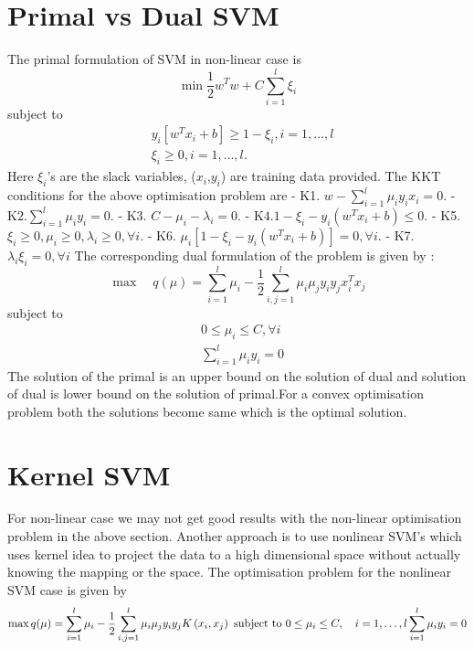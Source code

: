 \documentclass[../main.tex]{subfiles}
\begin{document}
\section{Primal vs Dual SVM}
The primal formulation of SVM in non-linear case is 
$$
\min \frac{1}{2} w^{T} w+C \sum_{i=1}^{l} \xi_{i}
$$
subject to
$$
\begin{aligned}
&y_{i}\left[w^{T} x_{i}+b\right] \geq 1-\xi_{i}, i=1, \ldots, l \\
&\xi_{i} \geq 0, i=1, \ldots, l .
\end{aligned}
$$
Here $\xi_{i}$'s are the slack variables, ($x_{i}$,$y_{i}$) are training data provided.
The KKT conditions for the above optimisation problem are 
\newline
- K1. $w-\sum_{i=1}^{l} \mu_{i} y_{i} x_{i}=0$.
\newline
- $\mathrm{K} 2 . \sum_{i=1}^{l} \mu_{i} y_{i}=0$.
\newline
- K3. $C-\mu_{i}-\lambda_{i}=0$.
\newline
- $\mathrm{K} 4.1-\xi_{i}-y_{i}\left(w^{T} x_{i}+b\right) \leq 0$.
\newline
- K5. $\xi_{i} \geq 0, \mu_{i} \geq 0, \lambda_{i} \geq 0, \forall i$.
\newline
- K6. $\mu_{i}\left[1-\xi_{i}-y_{i}\left(w^{T} x_{i}+b\right)\right]=0, \forall i$.
\newline
- K7. $\lambda_{i} \xi_{i}=0, \forall i$
\newline
The corresponding dual formulation of the problem is given by :
$$
\max \quad q(\mu)=\sum_{i=1}^{l} \mu_{i}-\frac{1}{2} \sum_{i, j=1}^{l} \mu_{i} \mu_{j} y_{i} y_{j} x_{i}^{T} x_{j}
$$
subject to
$$
\begin{aligned}
&0 \leq \mu_{i} \leq C, \forall i \\
&\sum_{i=1}^{l} \mu_{i} y_{i}=0
\end{aligned}
$$
The solution of the primal is an upper bound on the solution of dual and solution of dual is lower bound on the solution of primal.For a convex optimisation problem both the solutions become same which is the optimal solution.

\section{Kernel SVM}
For non-linear case we may not get good results with the non-linear optimisation problem in the above section. Another approach is to use nonlinear SVM's which uses kernel idea to project the data to a high dimensional space without actually knowing the mapping or the space. The optimisation problem for the nonlinear SVM case is given by 
$$
\max  q(\mu)=\sum_{i=1}^{l} \mu_{i}-\frac{1}{2} \sum_{i, j=1}^{l} \mu_{i} \mu_{j} y_{i} y_{j} K\left(x_{i}, x_{j}\right) \\
\text { subject to }  0 \leq \mu_{i} \leq C, \quad i=1, \ldots, l \\
 \sum_{i=1}^{l} \mu_{i} y_{i}=0
$$
\end{document}
